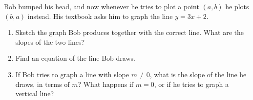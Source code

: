 Bob bumped his head, and now whenever he tries to plot a point $(a,b)$ he plots $(b,a)$ instead. His textbook asks him to graph the line $y=3x+2$.
\begin{enumerate}
\item[(a)] Sketch the graph Bob produces together with the correct line. What are the slopes of the two lines?
\item[(b)] Find an equation of the line Bob draws.
\item[(c)] If Bob tries to graph a line with slope $m\ne0$, what is the slope of the line he draws, in terms of $m$? What happens if $m=0$, or if he tries to graph a vertical line?
\end{enumerate}
